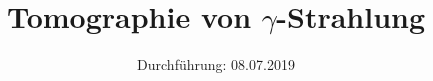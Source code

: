 

\subject{V14}
\title{Tomographie von $γ$-Strahlung}
\date{%
  Durchführung: 08.07.2019
}



\maketitle
\thispagestyle{empty}
\tableofcontents
\newpage



\newpage

\newpage

\printbibliography{}



